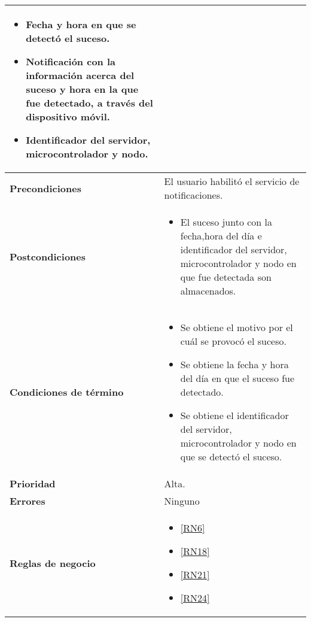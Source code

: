 \begin{longtable}{|J{5cm}|J{10.3cm}|}
\begin{itemize}
			\item Fecha y hora en que se detectó el suceso.
			\item Notificación con la información acerca del suceso y hora en la que fue detectado, a través del dispositivo móvil.
			\item Identificador del servidor, microcontrolador y nodo.
		\end{itemize} \\ \hline
	\textbf{Precondiciones} &
		El usuario habilitó el servicio de notificaciones.\\ \hline
	\textbf{Postcondiciones} &
		\begin{itemize}
			\item El suceso junto con la fecha,hora del día e identificador del servidor, microcontrolador y nodo en que fue detectada son almacenados.
		\end{itemize}\\ \hline
	\textbf{Condiciones de término} & 
		\begin{itemize}
			\item Se obtiene el motivo por el cuál se provocó el suceso.
			\item Se obtiene la fecha y hora del día en que el suceso fue detectado.
			\item Se obtiene el identificador del servidor, microcontrolador y nodo en que se detectó el suceso.
		\end{itemize} \\ \hline 
	\textbf{Prioridad} & 
		Alta. \\ \hline
	\textbf{Errores} & 
		Ninguno \\ \hline
	\textbf{Reglas de negocio} & 
	    \begin{itemize}
			\item \ref{RN6}
			\item \ref{RN18}
			\item \ref{RN21}
			\item \ref{RN24}
		\end{itemize} \\ \hline 
		 

\end{longtable}

